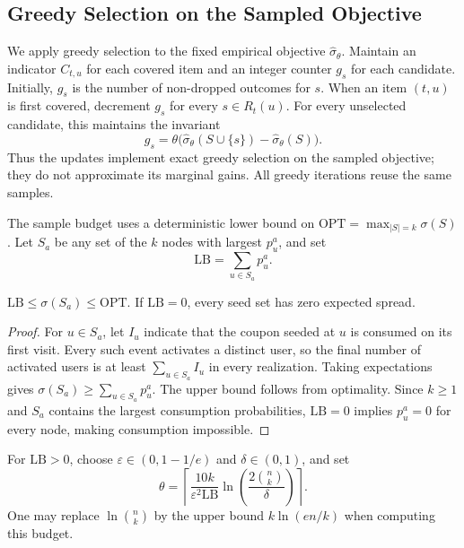 \documentclass[sigconf]{acmart}
\begin{document}
\subsection{Greedy Selection on the Sampled Objective}
\label{sec:greedy-selection}

We apply greedy selection to the fixed empirical objective
$\hat\sigma_\theta$. Maintain an indicator $C_{t,u}$ for each
covered item and an integer counter $g_s$ for each candidate.
Initially, $g_s$ is the number of non-dropped outcomes for $s$.
When an item $(t,u)$ is first covered, decrement $g_s$ for every
$s\in R_t(u)$. For every unselected candidate, this maintains
the invariant
\[
 g_s=\theta\bigl(\hat\sigma_\theta(S\cup\{s\})
                       -\hat\sigma_\theta(S)\bigr).
\]
Thus the updates implement exact greedy selection on the sampled
objective; they do not approximate its marginal gains.
All greedy iterations reuse the same samples.

The sample budget uses a deterministic lower bound on
$\mathrm{OPT}=\max_{|S|=k}\sigma(S)$. Let $S_a$ be any set of
the $k$ nodes with largest $p_u^a$, and set
\begin{equation}
\label{eq:opt-lower-bound}
  \mathrm{LB}=\sum_{u\in S_a}p_u^a.
\end{equation}

\begin{lemma}
\label{lem:lower-bound}
$\mathrm{LB}\le\sigma(S_a)\le\mathrm{OPT}$.
If $\mathrm{LB}=0$, every seed set has zero expected spread.
\end{lemma}
\begin{proof}
For $u\in S_a$, let $I_u$ indicate that the coupon seeded at $u$
is consumed on its first visit. Every such event activates a
distinct user, so the final number of activated users is at least
$\sum_{u\in S_a}I_u$ in every realization.
Taking expectations gives $\sigma(S_a)\ge\sum_{u\in S_a}p_u^a$.
The upper bound follows from optimality. Since $k\ge1$ and $S_a$
contains the largest consumption probabilities, $\mathrm{LB}=0$
implies $p_u^a=0$ for every node, making consumption impossible.
\end{proof}

For $\mathrm{LB}>0$, choose $\varepsilon\in(0,1-1/e)$ and
$\delta\in(0,1)$, and set
\begin{equation}
\label{eq:sample-budget}
 \theta=\left\lceil
 \frac{10k}{\varepsilon^2\mathrm{LB}}
 \ln\left(\frac{2\binom nk}{\delta}\right)
 \right\rceil.
\end{equation}
One may replace $\ln\binom nk$ by the upper bound $k\ln(en/k)$
when computing this budget.
\end{document}
